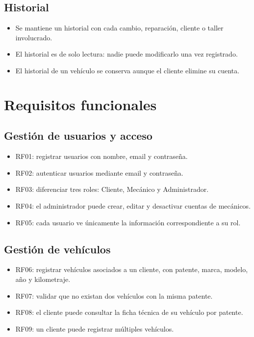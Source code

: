 \documentclass[11pt]{article}
\begin{document}
\subsection{Historial}
\begin{itemize}
  \item Se mantiene un historial con cada cambio, reparación, cliente o taller involucrado.
  \item El historial es de solo lectura: nadie puede modificarlo una vez registrado.
  \item El historial de un vehículo se conserva aunque el cliente elimine su cuenta.
\end{itemize}

\section{Requisitos funcionales}

\subsection{Gestión de usuarios y acceso}
\begin{itemize}
  \item RF01: registrar usuarios con nombre, email y contraseña.
  \item RF02: autenticar usuarios mediante email y contraseña.
  \item RF03: diferenciar tres roles: Cliente, Mecánico y Administrador.
  \item RF04: el administrador puede crear, editar y desactivar cuentas de mecánicos.
  \item RF05: cada usuario ve únicamente la información correspondiente a su rol.
\end{itemize}

\subsection{Gestión de vehículos}
\begin{itemize}
  \item RF06: registrar vehículos asociados a un cliente, con patente, marca, modelo, año y kilometraje.
  \item RF07: validar que no existan dos vehículos con la misma patente.
  \item RF08: el cliente puede consultar la ficha técnica de su vehículo por patente.
  \item RF09: un cliente puede registrar múltiples vehículos.
\end{itemize}
\end{document}

